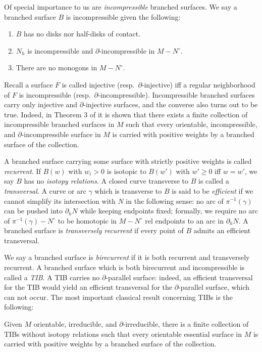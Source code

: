 \documentclass[12pt]{article}
\newcommand{\del}{\partial}
\renewcommand{\ge}{\geqslant}
\renewcommand{\it}{\textit}
\theoremstyle{nonumberdefinition}
\theoremstyle{empty}
\theoremstyle{empty}
\begin{document}
Of special importance to us are \it{incompressible} branched surfaces. We say a branched surface $B$ is incompressible given the following:
\begin{enumerate}[leftmargin=1.5cm]
	\item $B$ has no disks nor half-disks of contact.
	\item $N_h$ is incompressible and $\del$-incompressible in $M - N^\circ$.
	\item There are no monogons in $M - N^\circ$.
\end{enumerate}

Recall a surface $F$ is called injective (resp.~$\del$-injective) iff a regular neighborhood of $F$ is incompressible (resp.~$\del$-incompressible). Incompressible branched surfaces carry only injective and $\del$-injective surfaces, and the converse also turns out to be true. Indeed, in Theorem 3 of \cite{oertelIncompressibleBranchedSurfaces1984} it is shown that there exists a finite collection of incompressible branched surfaces in $M$ such that every orientable, incompressible, and $\del$-incompressible surface in $M$ is carried with positive weights by a branched surface of the collection.

A branched surface carrying some surface with strictly positive weights is called \it{recurrent}. If $B(w)$ with $w_i > 0$ is isotopic to $B(w')$ with $w' \ge 0$ iff $w = w'$, we say $B$ has no \it{isotopy relations}. A closed curve transverse to $B$ is called a \it{transversal}. A curve or arc $\gamma$ which is transverse to $B$ is said to be \it{efficient}  if we cannot simplify its intersection with $N$ in the following sense: no arc of $\pi^{-1}(\gamma)$ can be pushed into $\partial_h N$ while keeping endpoints fixed; formally, we require no arc of $\pi^{-1}(\gamma) - N^\circ$ to be homotopic in $M - N^\circ$ rel endpoints to an arc in $\partial_h N$. A branched surface is \it{transversely recurrent} if every point of $B$ admits an efficient transversal.

We say a branched surface is \it{birecurrent} if it is both recurrent and transversely recurrent. A branched surface which is both birecurrent and incompressible is called a \it{TIB}. A TIB carries no $\del$-parallel surface: indeed, an efficient transversal for the TIB would yield an efficient transversal for the $\del$-parallel surface, which can not occur. The most important classical result concerning TIBs is the following:

\begin{reference}
	Given $M$ orientable, irreducible, and $\del$-irreducible, there is a finite collection of TIBs without isotopy relations such that every orientable essential surface in $M$ is carried with positive weights by a branched surface of the collection.
\end{reference}
\end{document}
